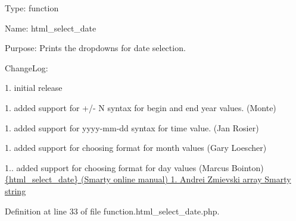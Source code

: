 \-Type\-: function\par
 \-Name\-: html\-\_\-select\-\_\-date\par
 \-Purpose\-: \-Prints the dropdowns for date selection.

\-Change\-Log\-:\par

\begin{DoxyItemize}
\item 1. initial release
\item 1. added support for +/-\/ \-N syntax for begin and end year values. (\-Monte)
\item 1. added support for yyyy-\/mm-\/dd syntax for time value. (\-Jan \-Rosier)
\item 1. added support for choosing format for month values (\-Gary \-Loescher)
\item 1.. added support for choosing format for day values (\-Marcus \-Bointon) \hyperlink{}{\{html\-\_\-select\-\_\-date\} (\-Smarty online manual)  1.  \-Andrei \-Zmievski  array  \-Smarty  string }
\end{DoxyItemize}

\-Definition at line 33 of file function.\-html\-\_\-select\-\_\-date.\-php.


